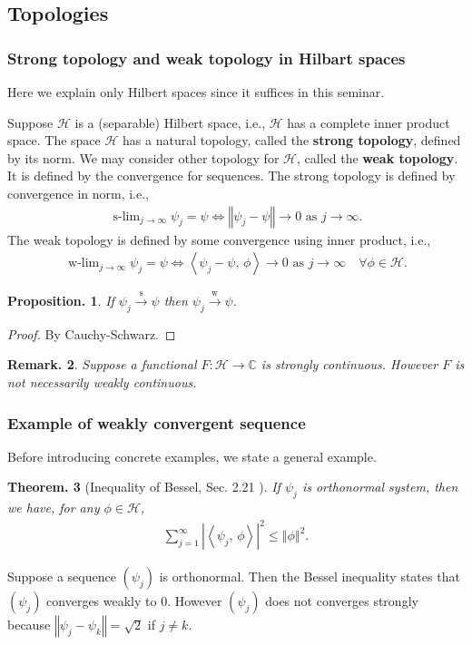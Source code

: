\documentclass[openany, a4paper, oneside]{book}
\DeclareMathOperator*{\slim}{s-lim}
\DeclareMathOperator*{\wlim}{w-lim}
\theoremstyle{break}
\newtheorem{thm}{Theorem.}[section]
\newtheorem{prop}[thm]{Proposition.}
\theoremstyle{breakdefn}
\newtheorem{rem}[thm]{Remark.}
\newcommand{\abs}[1]{\left|#1\right|}
\newcommand{\norm}[1]{\left\Vert#1\right\Vert}
\newcommand{\bkt}[2]{\left\langle#1,\,#2\right\rangle}
\newcommand{\bbC}{\mathbb{C}}
\newcommand{\calH}{\mathcal{H}}
\newcommand{\sto}{\xrightarrow{\text{s}}}
\newcommand{\wto}{\xrightarrow{\text{w}}}
\begin{document}
\subsection{Topologies \label{Lieb-Loss_Analysis_chap11_36}}
\label{sec-7-10-2-5}
\subsubsection{Strong topology and weak topology in Hilbart spaces}
\label{sec-7-10-2-5-1}

Here we explain only Hilbert spaces since it suffices in this seminar.

Suppose $\calH$ is a (separable) Hilbert space, i.e., $\calH$ has a complete inner product space.
The space $\calH$ has a natural topology, called the \textbf{strong topology}, defined by its norm.
We may consider other topology for $\calH$, called the \textbf{weak topology}.
It is defined by the convergence for sequences.
The strong topology is defined by convergence in norm, i.e.,
\begin{align}
 \slim_{j \to \infty} \psi_j = \psi
 \Longleftrightarrow
 \norm{\psi_j - \psi} \to 0 \text{ as } j \to \infty.
\end{align}
The weak topology is defined by some convergence using inner product, i.e.,
\begin{align}
 \wlim_{j \to \infty} \psi_j = \psi
 \Longleftrightarrow
 \bkt{\psi_j - \psi}{\phi} \to 0 \text{ as } j \to \infty \quad \forall \phi \in \calH.
\end{align}
\begin{prop}
 If $\psi_j \sto \psi$ then $\psi_j \wto \psi$.
\end{prop}
\begin{proof}
By Cauchy-Schwarz.
\end{proof}
\begin{rem}
 Suppose a functional $F \colon \calH \to \bbC$ is strongly continuous.
 However $F$ is not necessarily weakly continuous.
\end{rem}
\subsubsection{Example of weakly convergent sequence}
\label{sec-7-10-2-5-2}

Before introducing concrete examples, we state a general example.
\begin{thm}[Inequality of Bessel, Sec. 2.21 \cite{LiebLoss1}]
 If $\psi_j$ is orthonormal system, then we have, for any $\phi \in \calH$,
 \begin{align}
  \sum_{j = 1}^{\infty} \abs{\bkt{\psi_j}{\phi}}^2
  \leq
  \norm{\phi}^2.
 \end{align}
\end{thm}
Suppose a sequence $(\psi_j)$ is orthonormal.
Then the Bessel inequality states that $(\psi_j)$ converges weakly to 0.
However $(\psi_j)$ does not converges strongly because $\norm{\psi_j - \psi_k} = \sqrt{2}$ if $j \neq k$.
\end{document}
